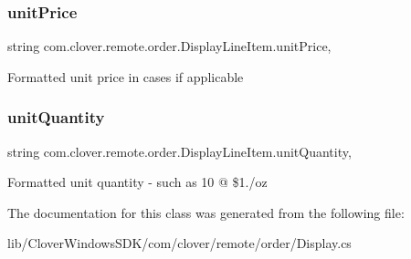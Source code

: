 \subsubsection{\texorpdfstring{unit\+Price}{unitPrice}}
{\footnotesize\ttfamily string com.\+clover.\+remote.\+order.\+Display\+Line\+Item.\+unit\+Price\hspace{0.3cm}{\ttfamily [get]}, {\ttfamily [set]}}

Formatted unit price in cases if applicable \mbox{\label{classcom_1_1clover_1_1remote_1_1order_1_1_display_line_item_abbf444cf6347fc085dd541cfc9cb02a0}} 
\subsubsection{\texorpdfstring{unit\+Quantity}{unitQuantity}}
{\footnotesize\ttfamily string com.\+clover.\+remote.\+order.\+Display\+Line\+Item.\+unit\+Quantity\hspace{0.3cm}{\ttfamily [get]}, {\ttfamily [set]}}

Formatted unit quantity -\/ such as 10 @ \$1./oz 

The documentation for this class was generated from the following file\+:\begin{DoxyCompactItemize}
\item 
lib/\+Clover\+Windows\+S\+D\+K/com/clover/remote/order/Display.\+cs\end{DoxyCompactItemize}
